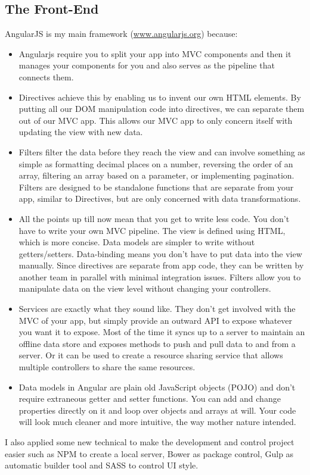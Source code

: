 \documentclass[a4paper,12pt]{article}
\begin{document}
\subsection{The Front-End}
AngularJS is my main framework (\url{www.angularjs.org}) because:
\begin{itemize}
	\item Angularjs require you to split your app into MVC components and then it manages your components for you and also serves as the pipeline that connects them.
	\item Directives achieve this by enabling us to invent our own HTML elements. By putting all our DOM manipulation code into directives, we can separate them out of our MVC app. This allows our MVC app to only concern itself with updating the view with new data.
	\item Filters filter the data before they reach the view and can involve something as simple as formatting decimal places on a number, reversing the order of an array, filtering an array based on a parameter, or implementing pagination. Filters are designed to be standalone functions that are separate from your app, similar to Directives, but are only concerned with data transformations.
	\item All the points up till now mean that you get to write less code. You don’t have to write your own MVC pipeline. The view is defined using HTML, which is more concise. Data models are simpler to write without getters/setters. Data-binding means you don’t have to put data into the view manually. Since directives are separate from app code, they can be written by another team in parallel with minimal integration issues. Filters allow you to manipulate data on the view level without changing your controllers.
	\item Services are exactly what they sound like. They don’t get involved with the MVC of your app, but simply provide an outward API to expose whatever you want it to expose. Most of the time it syncs up to a server to maintain an offline data store and exposes methods to push and pull data to and from a server. Or it can be used to create a resource sharing service that allows multiple controllers to share the same resources.
	\item Data models in Angular are plain old JavaScript objects (POJO) and don’t require extraneous getter and setter functions. You can add and change properties directly on it and loop over objects and arrays at will. Your code will look much cleaner and more intuitive, the way mother nature intended.
\end{itemize}
I also applied some new technical to make the development and
control project easier such as NPM to create a local server, Bower as package control, Gulp as automatic builder tool and SASS to control UI style.
\end{document}
